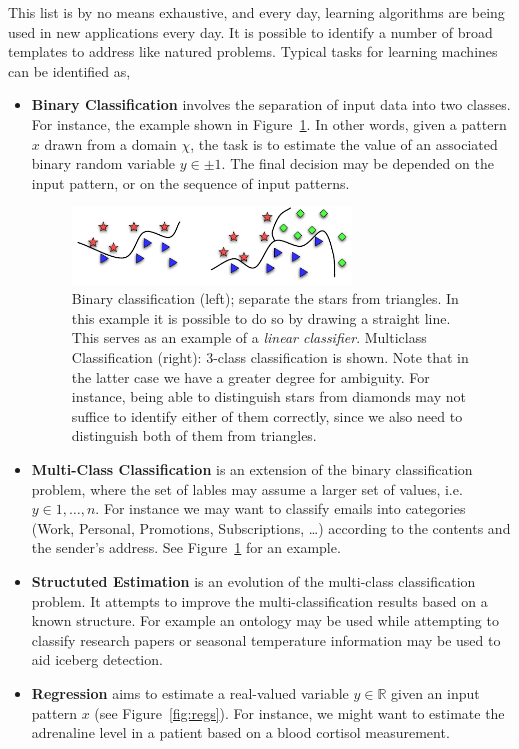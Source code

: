 This list is by no means exhaustive, and every day, learning algorithms are being used in new applications every day. It is possible to identify a number of broad templates to address like natured problems. Typical tasks for learning machines can be identified as,~\cite[7-10]{smolaML}
\begin{itemize}
\item \textbf{Binary Classification} involves the separation of input data into two classes. For instance, the example shown in Figure~\ref{fig:binclass}. In other words, given a pattern $x$ drawn from a domain $\chi$, the task is to estimate the value of an associated binary random variable $y \in {\pm1}$. The final decision may be depended on the input pattern, or on the sequence of input patterns. 

	\begin{figure}
	\centering
	\includegraphics[width=0.7\textwidth]{Figures/classification}
	\caption[Illustration of classification.]{Binary classification (left); separate the stars from triangles. In this example it is possible to do so by drawing a straight line. This serves as an example of a \emph{linear classifier}. Multiclass Classification (right): 3-class classification is shown. Note that in the
	latter case we have a greater degree for ambiguity. For instance, being able to
	distinguish stars from diamonds may not suffice to identify either of them correctly,
	since we also need to distinguish both of them from triangles.}
	\label{fig:binclass}
	\end{figure}	

\item \textbf{Multi-Class Classification} is an extension of the binary classification problem, where the set of lables may assume a larger set of values, i.e. $y \in {1,\ldots,n}$. For instance we may want to classify emails into categories (Work, Personal, Promotions, Subscriptions, \ldots) according to the contents and the sender's address.  See Figure~\ref{fig:binclass} for an example. 
\item \textbf{Structuted Estimation} is an evolution of the multi-class classification problem. It attempts to improve the multi-classification results based on a known structure. For example an ontology may be used while attempting to classify research papers or seasonal temperature information may be used to aid iceberg detection.
\item \textbf{Regression} aims to estimate a real-valued variable $y\in\mathbb{R}$ given an input pattern $x$ (see Figure~\ref{fig:regs}). For instance, we might want to estimate the adrenaline level in a patient based on a blood cortisol measurement.


\end{itemize}
